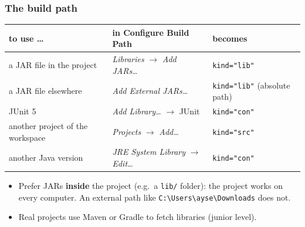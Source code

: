 \documentclass[aspectratio=169,10pt,compress]{beamer}
\begin{document}
\begin{frame}[t,fragile] \frametitle{The build path}
  \begin{center}\small
  \begin{tabular}{lll}
    \toprule
    \textbf{to use \dots}            & \textbf{in Configure Build Path}          & \textbf{becomes} \\
    \midrule
    a JAR file in the project      & \emph{Libraries} $\to$ \emph{Add JARs\dots}         & \texttt{kind="lib"} \\
    a JAR file elsewhere           & \emph{Add External JARs\dots}                       & \texttt{kind="lib"} (absolute path) \\
    JUnit 5                        & \emph{Add Library\dots} $\to$ JUnit                 & \texttt{kind="con"} \\
    another project of the workspace & \emph{Projects} $\to$ \emph{Add\dots}             & \texttt{kind="src"} \\
    another Java version           & \emph{JRE System Library} $\to$ \emph{Edit\dots}    & \texttt{kind="con"} \\
    \bottomrule
  \end{tabular}
  \end{center}
  \begin{itemize}\small
    \item Prefer JARs \textbf{inside} the project (e.g.\ a \texttt{lib/} folder): the project works on every computer.
          An external path like \texttt{C:\textbackslash Users\textbackslash ayse\textbackslash Downloads} does not.
    \item Real projects use Maven or Gradle to fetch libraries (junior level).
  \end{itemize}
\end{frame}

\end{document}
